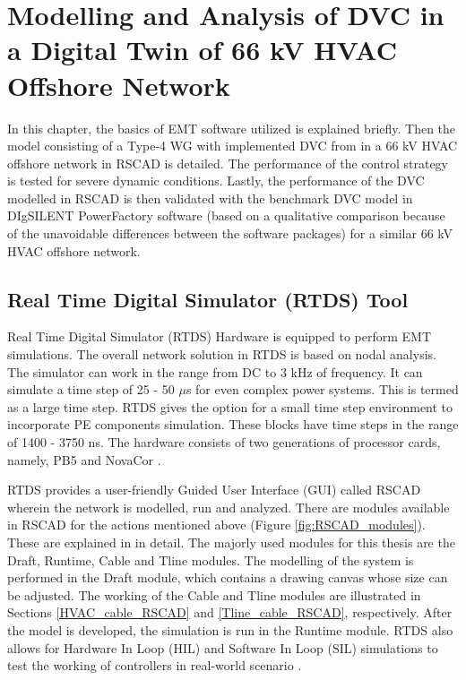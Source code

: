 \chapter{Modelling and Analysis of DVC in a Digital Twin of 66 kV HVAC Offshore Network}\label{3}

In this chapter, the basics of \gls{EMT} software utilized is explained briefly. Then the model consisting of a Type-4 \gls{WG} with implemented \gls{DVC} from \cite{korai_dynamic_2019} in a 66 kV \gls{HVAC} offshore network in RSCAD is detailed. The performance of the control strategy is tested for severe dynamic conditions. Lastly, the performance of the \gls{DVC} modelled in RSCAD is then validated with the benchmark \gls{DVC} model in DIgSILENT PowerFactory software \cite{erlich_description_2018} (based on a qualitative comparison because of the unavoidable differences between the software packages) for a similar 66 kV \gls{HVAC} offshore network.

\section{Real Time Digital Simulator (RTDS) Tool}\label{RTDS_Theory}
Real Time Digital Simulator (\gls{RTDS}) Hardware is equipped to perform \gls{EMT} simulations. The overall network solution in \gls{RTDS} is based on nodal analysis. The simulator can work in the range from \gls{DC} to 3 kHz of frequency. It can simulate a time step of 25 - 50 $\mu$s for even complex power systems. This is termed as a large time step. \gls{RTDS} gives the option for a small time step environment to incorporate \gls{PE} components simulation. These blocks have time steps in the range of 1400  - 3750 ns. The hardware consists of two generations of processor cards, namely, PB5 and NovaCor \cite{rtds_tech}.  

\gls{RTDS} provides a user-friendly Guided User Interface (GUI) called RSCAD wherein the network is modelled, run and analyzed. There are modules available in RSCAD for the actions mentioned above (Figure \ref{fig:RSCAD_modules}). These are explained in \cite{rtds_tech} in detail. The majorly used modules for this thesis are the Draft, Runtime, Cable and Tline modules. The modelling of the system is performed in the Draft module, which contains a drawing canvas whose size can be adjusted. The working of the Cable and Tline modules are illustrated in Sections \ref{HVAC_cable_RSCAD} and \ref{Tline_cable_RSCAD}, respectively. After the model is developed, the simulation is run in the Runtime module. \gls{RTDS} also allows for Hardware In Loop (HIL) and Software In Loop (SIL) simulations to test the working of controllers in real-world scenario \cite{rtds_tech_hardware}.

